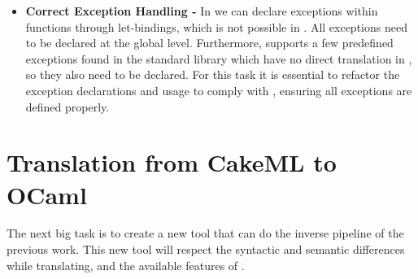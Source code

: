 \begin{itemize}
\item \textbf{Correct Exception Handling -} In \ocaml we can declare exceptions within functions through let-bindings, which is not 
possible in \cml. All exceptions need to be 
declared at the global level. Furthermore, \ocaml supports a few predefined exceptions found in the standard library which have no 
direct translation in \cml, so they also need to be declared. For this task it is essential to refactor the exception declarations 
and usage to comply with \cml, ensuring all exceptions are defined properly.

\end{itemize}

\section{Translation from CakeML to OCaml}

The next big task is to create a new tool that can do the inverse pipeline of the previous work. This new tool will respect
the syntactic and semantic differences while translating, and the available features of \cml.

